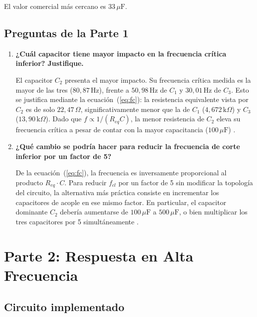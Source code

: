 \documentclass[journal]{IEEEtran}
\begin{document}
El valor comercial m\'as cercano es $33\,\mu\text{F}$.

\subsection{Preguntas de la Parte 1}

\begin{enumerate}

\item \textbf{¿Cu\'al capacitor tiene mayor impacto en la frecuencia cr\'itica inferior? Justifique.}

El capacitor $C_2$ presenta el mayor impacto. Su frecuencia cr\'itica medida es la mayor de las tres ($80{,}87\,\text{Hz}$), frente a $50{,}98\,\text{Hz}$ de $C_1$ y $30{,}01\,\text{Hz}$ de $C_3$. Esto se justifica mediante la ecuaci\'on~(\ref{eq:fc}): la resistencia equivalente vista por $C_2$ es de solo $22{,}47\,\Omega$, significativamente menor que la de $C_1$ ($4{,}672\,\text{k}\Omega$) y $C_3$ ($13{,}90\,\text{k}\Omega$). Dado que $f \propto 1/(R_{eq} C)$, la menor resistencia de $C_2$ eleva su frecuencia cr\'itica a pesar de contar con la mayor capacitancia ($100\,\mu\text{F}$) \cite{Floyd2008}.

\item \textbf{¿Qu\'e cambio se podr\'ia hacer para reducir la frecuencia de corte inferior por un factor de 5?}

De la ecuaci\'on~(\ref{eq:fc}), la frecuencia es inversamente proporcional al producto $R_{eq} \cdot C$. Para reducir $f_{cl}$ por un factor de 5 sin modificar la topolog\'ia del circuito, la alternativa m\'as pr\'actica consiste en incrementar los capacitores de acople en ese mismo factor. En particular, el capacitor dominante $C_2$ deber\'ia aumentarse de $100\,\mu\text{F}$ a $500\,\mu\text{F}$, o bien multiplicar los tres capacitores por 5 simult\'aneamente \cite{Floyd2008}.

\end{enumerate}


\section{Parte 2: Respuesta en Alta Frecuencia}

\subsection{Circuito implementado}
\end{document}
